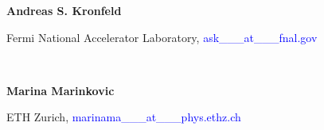 \documentclass[a4paper,10pt]{article}
\begin{document}
\begin{minipage}[t]{0.25\textwidth}
\textbf{Andreas S. Kronfeld}
\end{minipage} \begin{minipage}[t]{0.75\textwidth} 
Fermi National Accelerator Laboratory, \textcolor{blue}{ask\_\_\_at\_\_\_fnal.gov}
\end{minipage} \\ 

% 
% 
%  

\begin{minipage}[t]{0.25\textwidth}
\textbf{Marina Marinkovic}
\end{minipage} \begin{minipage}[t]{0.75\textwidth} 
ETH Zurich, \textcolor{blue}{marinama\_\_\_at\_\_\_phys.ethz.ch}
\end{minipage} \\
\end{document}
